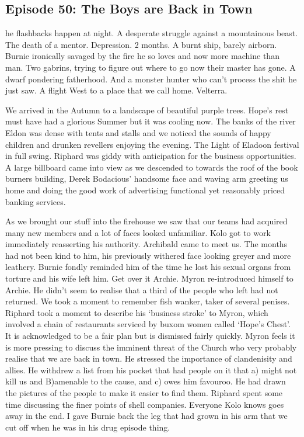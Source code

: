 \subsection{Episode 50: The Boys are Back in Town}

he flashbacks happen at night. A desperate struggle against a mountainous beast. The death of a mentor. Depression. 2 months. A burnt ship, barely airborn. Burnie ironically savaged by the fire he so loves and now more machine than man. Two gabrins, trying to figure out where to go now their master has gone. A dwarf pondering fatherhood. And a monster hunter who can’t process the shit he just saw. A flight West to a place that we call home. Velterra.\medskip

We arrived in the Autumn to a landscape of beautiful purple trees. Hope’s rest must have had a glorious Summer but it was cooling now. The banks of the river Eldon was dense with tents and stalls and we noticed the sounds of happy children and drunken revellers enjoying the evening. The Light of Eladoon festival in full swing. Riphard was giddy with anticipation for the business opportunities. A large billboard came into view as we descended to towards the roof of the book burners building, Derek Bodacious’ handsome face and waving arm greeting us home and doing the good work of advertising functional yet reasonably priced banking services.\medskip

As we brought our stuff into the firehouse we saw that our teams had acquired many new members and a lot of faces looked unfamiliar. Kolo got to work immediately reasserting his authority. Archibald came to meet us. The months had not been kind to him, his previously withered face looking greyer and more leathery. Burnie fondly reminded him of the time he lost his sexual organs from torture and his wife left him. Get over it Archie. Myron re-introduced himself to Archie. He didn’t seem to realise that a third of the people who left had not returned. We took a moment to remember fish wanker, taker of several penises. Riphard took a moment to describe his ‘business stroke’ to Myron, which involved a chain of restaurants serviced by buxom women called ‘Hope’s Chest’. It is acknowledged to be a fair plan but is dismissed fairly quickly. Myron feels it is more pressing to discuss the imminent threat of the Church who very probably realise that we are back in town. He stressed the importance of clandenisity and allies. He withdrew a list from his pocket that had people on it that a) might not kill us and B)amenable to the cause, and c) owes him favouroo. He had drawn the pictures of the people to make it easier to find them. Riphard spent some time discussing the finer points of shell companies. Everyone Kolo knows goes away in the end. I gave Burnie back the leg that had grown in his arm that we cut off when he was in his drug episode thing.\medskip

